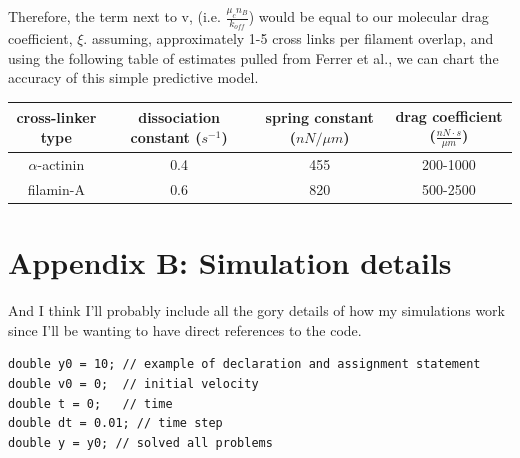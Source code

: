 \documentclass[prb,11pt]{revtex4-1}
\begin{document}
Therefore, the term next to v, (i.e. $\tfrac{\mu_c n_B}{k_{off}}$) would be equal to our molecular drag coefficient, $\xi$.  assuming, approximately 1-5 cross links per filament overlap, and using the following table of estimates pulled from Ferrer et al., we can chart the accuracy of this simple predictive model.

\begin{table}[h]
\begin{tabular}{c|c|c|c}
\textbf{cross-linker type} & \textbf{dissociation constant ($s^{-1}$)} & \textbf{spring constant ($nN / \mu m$)} & \textbf{drag coefficient ($\tfrac{nN \cdot s}{\mu m}$)} \\ \hline
$\alpha$-actinin & 0.4 & 455 & 200-1000 \\
filamin-A & 0.6 & 820 & 500-2500
\end{tabular}
\end{table}

\section{Appendix B: Simulation details}
And I think I'll probably include all the gory details of how my simulations work since I'll be wanting to have direct references to the code. 
\begin{verbatim}
double y0 = 10; // example of declaration and assignment statement
double v0 = 0;  // initial velocity
double t = 0;   // time
double dt = 0.01; // time step
double y = y0; // solved all problems
\end{verbatim}




\end{document}
